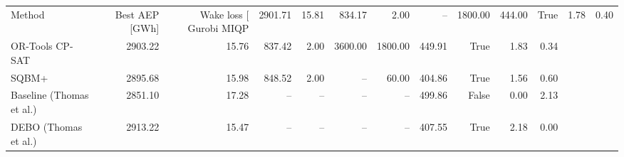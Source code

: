 \begin{tabular}{lrrrrrrrrrr}
\toprule
Method & Best AEP [GWh] & Wake loss [%
\midrule
Gurobi MIQP & 2901.71 & 15.81 & 834.17 & 2.00 & -- & 1800.00 & 444.00 & True & 1.78 & 0.40 \\
OR-Tools CP-SAT & 2903.22 & 15.76 & 837.42 & 2.00 & 3600.00 & 1800.00 & 449.91 & True & 1.83 & 0.34 \\
SQBM+ & 2895.68 & 15.98 & 848.52 & 2.00 & -- & 60.00 & 404.86 & True & 1.56 & 0.60 \\
Baseline (Thomas et al.) & 2851.10 & 17.28 & -- & -- & -- & -- & 499.86 & False & 0.00 & 2.13 \\
DEBO (Thomas et al.) & 2913.22 & 15.47 & -- & -- & -- & -- & 407.55 & True & 2.18 & 0.00 \\
\bottomrule
\end{tabular}
